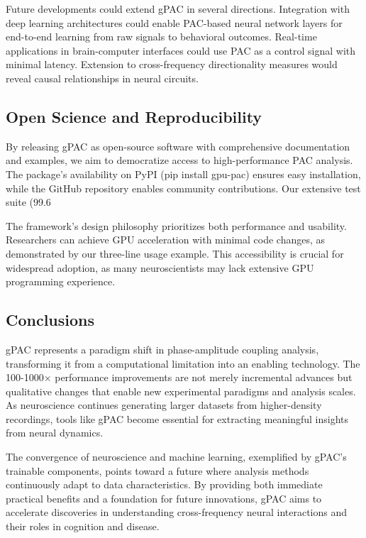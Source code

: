 Future developments could extend gPAC in several directions. Integration with deep learning architectures could enable PAC-based neural network layers for end-to-end learning from raw signals to behavioral outcomes. Real-time applications in brain-computer interfaces could use PAC as a control signal with minimal latency. Extension to cross-frequency directionality measures would reveal causal relationships in neural circuits.

\subsection{Open Science and Reproducibility}

By releasing gPAC as open-source software with comprehensive documentation and examples, we aim to democratize access to high-performance PAC analysis. The package's availability on PyPI (pip install gpu-pac) ensures easy installation, while the GitHub repository enables community contributions. Our extensive test suite (99.6%

The framework's design philosophy prioritizes both performance and usability. Researchers can achieve GPU acceleration with minimal code changes, as demonstrated by our three-line usage example. This accessibility is crucial for widespread adoption, as many neuroscientists may lack extensive GPU programming experience.

\subsection{Conclusions}

gPAC represents a paradigm shift in phase-amplitude coupling analysis, transforming it from a computational limitation into an enabling technology. The 100-1000× performance improvements are not merely incremental advances but qualitative changes that enable new experimental paradigms and analysis scales. As neuroscience continues generating larger datasets from higher-density recordings, tools like gPAC become essential for extracting meaningful insights from neural dynamics.

The convergence of neuroscience and machine learning, exemplified by gPAC's trainable components, points toward a future where analysis methods continuously adapt to data characteristics. By providing both immediate practical benefits and a foundation for future innovations, gPAC aims to accelerate discoveries in understanding cross-frequency neural interactions and their roles in cognition and disease.